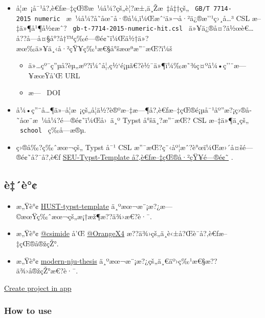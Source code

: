 \begin{itemize}
\tightlist
\item
  å­¦æ~¡å¯¹å?‚è€ƒæ--‡çŒ®æ~¼å¼?çš„è¦?æ±‚ä¸Žæ~‡å‡†çš„
  \texttt{\ GB/T\ 7714-2015\ numeric\ }
  æ~¼å¼?å­˜åœ¨å·®å¼‚ï¼Œæˆ`ä»¬å·²ä¿®æ''¹ç›¸å\ldots³ CSL æ--‡ä»¶å¹¶å½¢æˆ?
  \texttt{\ gb-t-7714-2015-numeric-hit.csl\ }
  ä»¥ä¿®å¤?ä½œè€\ldots å??å­---å¤§å°?å†™ç­‰é---®é¢˜ï¼Œä½†ä»?æœ‰ä»¥ä¸‹å·²çŸ¥ç‰¹æ€§å°šæœªæ''¯æŒ?ï¼š

  \begin{itemize}
  \tightlist
  \item
    ä»\ldots çº¯ç''µå­?èµ„æº?ï¼ˆå¦‚ç½`é¡µã€?è½¯ä»¶ï¼‰æ˜¾ç¤ºå¼•ç''¨æ---¥æœŸå'Œ
    URL
  \item
    æ---~ DOI
  \end{itemize}
\item
  å¼•ç''¨å\ldots¶ä»--å­¦æ~¡çš„å­¦ä½?è®ºæ--‡æ---¶å?‚è€ƒæ--‡çŒ®é¡µå¯¹åº''æ?¡ç›®å­˜åœ¨æ~¼å¼?é---®é¢˜ï¼Œå›~ä¸º
  Typst å°šä¸?æ''¯æŒ? CSL æ--‡ä»¶ä¸­çš„ \texttt{\ school\ } ç­‰å­---æ®µ.
\item
  ç›®å‰?ç‰ˆæœ¬çš„ Typst å¯¹ CSL
  æ''¯æŒ?ç¨‹åº¦æˆ?è°œï¼Œæ›´å¤šé---®é¢˜å?¯å?‚è€ƒ
  \href{https://github.com/csimide/SEU-Typst-Template/?tab=readme-ov-file\#\%E5\%8F\%82\%E8\%80\%83\%E6\%96\%87\%E7\%8C\%AE}{SEU-Typst-Template
  å?‚è€ƒæ--‡çŒ®å·²çŸ¥é---®é¢˜} .
\end{itemize}

\subsection{è‡´è°¢}\label{uxe8uxe8}

\begin{itemize}
\tightlist
\item
  æ„Ÿè°¢
  \href{https://github.com/werifu/HUST-typst-template}{HUST-typst-template}
  ä¸ºæœ¬æ¨¡æ?¿æ---©æœŸç‰ˆæœ¬çš„æ¡†æž¶æ??ä¾›æ€?è·¯.
\item
  æ„Ÿè°¢ \href{https://gist.github.com/csimide}{@csimide} å'Œ
  \href{https://github.com/OrangeX4}{@OrangeX4}
  æ??ä¾›çš„ä¸­è‹±å?Œè¯­å?‚è€ƒæ--‡çŒ®å®žçŽ°.
\item
  æ„Ÿè°¢
  \href{https://github.com/nju-lug/modern-nju-thesis}{modern-nju-thesis}
  ä¸ºæœ¬æ¨¡æ?¿çš„ä¸€äº›ç‰¹æ€§æ??ä¾›å®žçŽ°æ€?è·¯.
\end{itemize}

\href{/app?template=universal-hit-thesis&version=0.2.1}{Create project
in app}

\subsubsection{How to use}\label{how-to-use}

